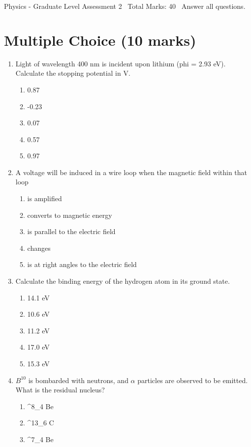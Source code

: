\documentclass[12pt]{article}
\begin{document}
\begin{center}
Physics - Graduate Level Assessment 2 \
Total Marks: 40 \
Answer all questions.
\end{center}

\section*{Multiple Choice (10 marks)}
\begin{enumerate}[label=\arabic*.]
\item Light of wavelength 400 nm is incident upon lithium (phi = 2.93 eV). Calculate the stopping potential in V.
\begin{enumerate}[label=(\alph*)]
    \item 0.87
    \item -0.23
    \item 0.07
    \item 0.57
    \item 0.97
\end{enumerate}
\item A voltage will be induced in a wire loop when the magnetic field within that loop
\begin{enumerate}[label=(\alph*)]
    \item is amplified
    \item converts to magnetic energy
    \item is parallel to the electric field
    \item changes
    \item is at right angles to the electric field
\end{enumerate}
\item Calculate the binding energy of the hydrogen atom in its ground state.
\begin{enumerate}[label=(\alph*)]
    \item 14.1 eV
    \item 10.6 eV
    \item 11.2 eV
    \item 17.0 eV
    \item 15.3 eV
\end{enumerate}
\item $B^10$ is bombarded with neutrons, and \ensuremath{\alpha} particles are observed to be emitted. What is the residual nucleus?
\begin{enumerate}[label=(\alph*)]
    \item ^8\_4 Be
    \item ^13\_6 C
    \item ^7\_4 Be

\end{enumerate}
\end{enumerate}
\end{document}
